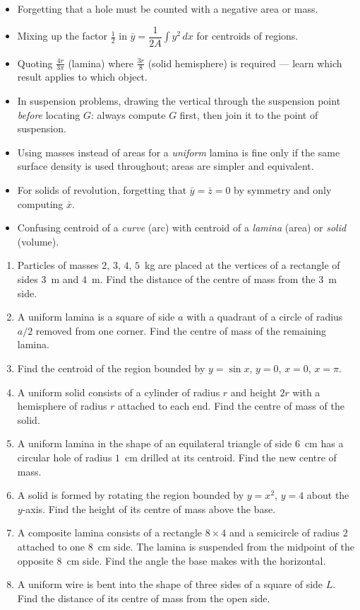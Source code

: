 \documentclass[11pt]{article}
\newcommand{\cle}[1]{{\popxbold\color{popdark}#1}}
\begin{document}
\begin{attention}
\begin{itemize}
\item Forgetting that a hole must be counted with a \cle{negative} area or mass.
\item Mixing up the factor $\tfrac12$ in $\bar{y}=\dfrac{1}{2A}\int y^2\,dx$ for centroids of regions.
\item Quoting $\tfrac{4r}{3\pi}$ (lamina) where $\tfrac{3r}{8}$ (solid hemisphere) is required — learn which result applies to which object.
\item In suspension problems, drawing the vertical through the suspension point \emph{before} locating $G$: always compute $G$ first, then join it to the point of suspension.
\item Using masses instead of areas for a \emph{uniform} lamina is fine only if the same surface density is used throughout; areas are simpler and equivalent.
\item For solids of revolution, forgetting that $\bar{y}=\bar{z}=0$ by symmetry and only computing $\bar{x}$.
\item Confusing centroid of a \emph{curve} (arc) with centroid of a \emph{lamina} (area) or \emph{solid} (volume).
\end{itemize}
\end{attention}

\begin{exercice}
\begin{enumerate}
\item Particles of masses $2$, $3$, $4$, $5$~kg are placed at the vertices of a rectangle of sides $3$~m and $4$~m. Find the distance of the centre of mass from the $3$~m side.
\item A uniform lamina is a square of side $a$ with a quadrant of a circle of radius $a/2$ removed from one corner. Find the centre of mass of the remaining lamina.
\item Find the centroid of the region bounded by $y=\sin x$, $y=0$, $x=0$, $x=\pi$.
\item A uniform solid consists of a cylinder of radius $r$ and height $2r$ with a hemisphere of radius $r$ attached to each end. Find the centre of mass of the solid.
\item A uniform lamina in the shape of an equilateral triangle of side $6$~cm has a circular hole of radius $1$~cm drilled at its centroid. Find the new centre of mass.
\item A solid is formed by rotating the region bounded by $y=x^2$, $y=4$ about the $y$-axis. Find the height of its centre of mass above the base.
\item A composite lamina consists of a rectangle $8\times 4$ and a semicircle of radius $2$ attached to one $8$~cm side. The lamina is suspended from the midpoint of the opposite $8$~cm side. Find the angle the base makes with the horizontal.
\item A uniform wire is bent into the shape of three sides of a square of side $L$. Find the distance of its centre of mass from the open side.
\end{enumerate}
\end{exercice}
\end{document}
